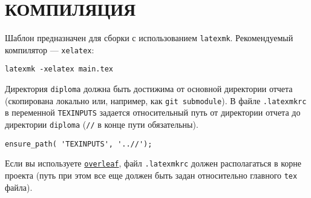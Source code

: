 \section{КОМПИЛЯЦИЯ}

Шаблон предназначен для сборки с использованием \texttt{latexmk}. Рекомендуемый компилятор --- \texttt{xelatex}:

\begin{verbatim}
latexmk -xelatex main.tex
\end{verbatim}

Директория \texttt{diploma} должна быть достижима от основной директории отчета (скопирована локально или, например, как \texttt{git submodule}). В файле \texttt{.latexmkrc} в переменной \texttt{TEXINPUTS} задается относительный путь от директории отчета до директории \texttt{diploma} (\texttt{//} в конце пути обязательны).

\begin{verbatim}
ensure_path( 'TEXINPUTS', '..//');
\end{verbatim}

Если вы используете \href{http://www.overleaf.com}{\texttt{overleaf}}, файл \texttt{.latexmkrc} должен располагаться в корне проекта (путь при этом все еще должен быть задан относительно главного \texttt{tex} файла).

\lipsum[1-2]